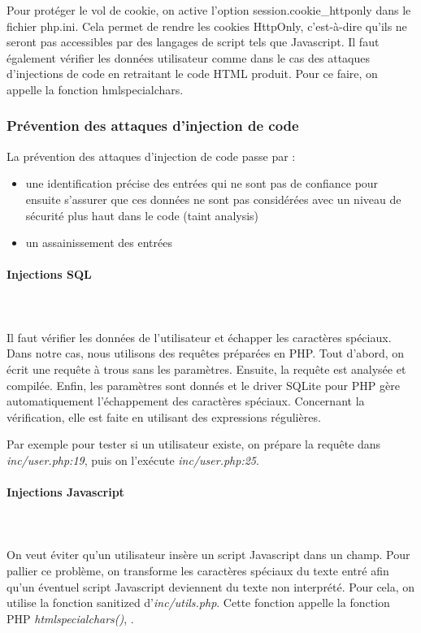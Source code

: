 \documentclass[a4paper]{article}
\begin{document}
Pour protéger le vol de cookie, on active l'option session.cookie\_httponly
dans le fichier php.ini. Cela permet de rendre les cookies HttpOnly,
c'est-à-dire qu'ils ne seront pas accessibles par des langages de script
tels que Javascript. Il faut également vérifier les données utilisateur
comme dans le cas des attaques d'injections de code en retraitant le code
HTML produit. Pour ce faire, on appelle la fonction hmlspecialchars.
 		
\subsubsection{Prévention des attaques d'injection de code}
La prévention des attaques d'injection de code passe par :
\begin{itemize}
	\item une identification précise des entrées qui ne sont pas de
		confiance pour ensuite s'assurer que ces données ne sont pas
		considérées avec un niveau de sécurité plus haut dans le code
		(taint analysis) 
	\item un assainissement des entrées
\end{itemize}
		
\paragraph{Injections SQL}
~~\\
\\
Il faut vérifier les données de l'utilisateur et échapper les caractères spéciaux.
Dans notre cas, nous utilisons des requêtes préparées en PHP.
Tout d'abord, on écrit une requête à trous sans les paramètres. Ensuite, la
requête est analysée et compilée. Enfin, les paramètres sont donnés et le driver
SQLite pour PHP gère automatiquement l'échappement des caractères spéciaux.
Concernant la vérification, elle est faite en utilisant des expressions régulières.			

Par exemple pour tester si un utilisateur existe, on prépare la requête
dans \textit{inc/user.php:19}, puis on l'exécute \textit{inc/user.php:25}.

\paragraph{Injections Javascript}
~~\\
\\
On veut éviter qu'un utilisateur insère un script Javascript dans un champ.
Pour pallier ce problème, on transforme les caractères spéciaux du texte entré afin
qu'un éventuel script Javascript deviennent du texte non interprété.
Pour cela, on utilise la fonction sanitized d'\textit{inc/utils.php}. Cette fonction
appelle la fonction PHP \textit{htmlspecialchars()}, .
		
\end{document}
